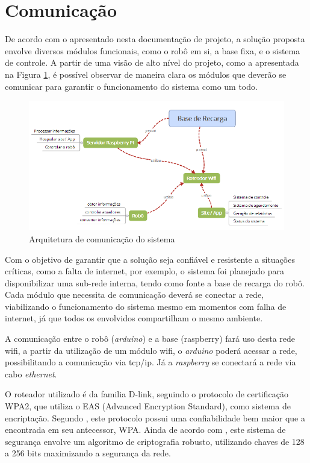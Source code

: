 

\section{Comunicação} %
\label{sub:comunicação}
	De acordo com o apresentado nesta documentação de projeto, a solução proposta envolve diversos módulos funcionais, como o robô em si, a base fixa, e o sistema de controle. A partir de uma visão de alto nível do projeto, como a apresentada na Figura \ref{img:arq_comu}, é possível observar de maneira clara os módulos que deverão se comunicar para garantir o funcionamento do sistema como um todo.

	\begin{figure}[H]
		\centering
		\includegraphics[scale=0.8]{figuras/arquitetura_comunicacao.png}
		\caption{Arquitetura de comunicação do sistema}
		\label{img:arq_comu}
	\end{figure}

	Com o objetivo de garantir que a solução seja confiável e resistente a situações críticas, como a falta de internet, por exemplo, o sistema foi planejado para disponibilizar uma sub-rede interna, tendo como fonte a base de recarga do robô. Cada módulo que necessita de comunicação deverá se conectar a rede, viabilizando o funcionamento do sistema mesmo em momentos com falha de internet, já que todos os envolvidos compartilham o mesmo ambiente.

	A comunicação entre o robô (\textit{arduino}) e a base (raspberry) fará uso desta rede wifi, a partir da utilização de um módulo wifi, o \textit{arduino} poderá acessar a rede, possibilitando a comunicação via tcp/ip. Já a \textit{raspberry} se conectará a rede via cabo \textit{ethernet}.

	O roteador utilizado é da familia D-link, seguindo o protocolo de certificação WPA2, que utiliza o EAS (Advanced Encryption Standard), como sistema de encriptação. Segundo \cite{wpa2}, este protocolo possui uma confiabilidade bem maior que a encontrada em seu antecessor, WPA. Ainda de acordo com \cite{wpa2}, este sistema de segurança envolve um algoritmo de criptografia robusto, utilizando chaves de 128 a 256 bits maximizando a segurança da rede.


